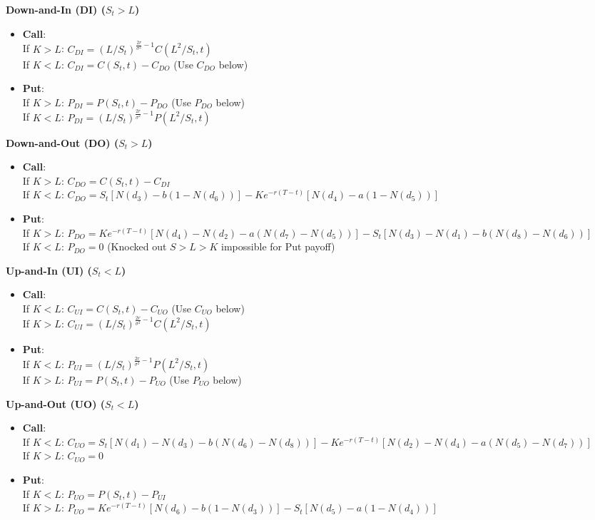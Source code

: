 \documentclass[8pt, a4paper, landscape]{extarticle}
\begin{document}
\begin{multicols*}{3}
\textbf{Down-and-In (DI) ($S_t > L$)}
\begin{itemize}
    \item \textbf{Call}: \\
    If $K > L$: $C_{DI} = (L/S_t)^{\frac{2r}{\sigma^2} - 1} C(L^2/S_t, t)$ \\
    If $K < L$: $C_{DI} = C(S_t, t) - C_{DO}$ (Use $C_{DO}$ below)
    \item \textbf{Put}: \\
    If $K > L$: $P_{DI} = P(S_t, t) - P_{DO}$ (Use $P_{DO}$ below) \\
    If $K < L$: $P_{DI} = (L/S_t)^{\frac{2r}{\sigma^2} - 1} P(L^2/S_t, t)$
\end{itemize}

\textbf{Down-and-Out (DO) ($S_t > L$)}
\begin{itemize}
    \item \textbf{Call}: \\
    If $K > L$: $C_{DO} = C(S_t, t) - C_{DI}$ \\
    If $K < L$: $C_{DO} = S_t [N(d_3) - b(1-N(d_6))] - K e^{-r(T-t)} [N(d_4) - a(1-N(d_5))]$
    \item \textbf{Put}: \\
    If $K > L$: $P_{DO} = K e^{-r(T-t)} [N(d_4) - N(d_2) - a(N(d_7) - N(d_5))] - S_t [N(d_3) - N(d_1) - b(N(d_8) - N(d_6))]$ \\
    If $K < L$: $P_{DO} = 0$ (Knocked out $S>L>K$ impossible for Put payoff)
\end{itemize}

\textbf{Up-and-In (UI) ($S_t < L$)}
\begin{itemize}
    \item \textbf{Call}: \\
    If $K < L$: $C_{UI} = C(S_t, t) - C_{UO}$ (Use $C_{UO}$ below) \\
    If $K > L$: $C_{UI} = (L/S_t)^{\frac{2r}{\sigma^2} - 1} C(L^2/S_t, t)$
    \item \textbf{Put}: \\
    If $K < L$: $P_{UI} = (L/S_t)^{\frac{2r}{\sigma^2} - 1} P(L^2/S_t, t)$ \\
    If $K > L$: $P_{UI} = P(S_t, t) - P_{UO}$ (Use $P_{UO}$ below)
\end{itemize}

\textbf{Up-and-Out (UO) ($S_t < L$)}
\begin{itemize}
    \item \textbf{Call}: \\
    If $K < L$: $C_{UO} = S_t [N(d_1) - N(d_3) - b(N(d_6) - N(d_8))] - K e^{-r(T-t)} [N(d_2) - N(d_4) - a(N(d_5) - N(d_7))]$ \\
    If $K > L$: $C_{UO} = 0$
    \item \textbf{Put}: \\
    If $K < L$: $P_{UO} = P(S_t, t) - P_{UI}$ \\
    If $K > L$: $P_{UO} = K e^{-r(T-t)} [N(d_6) - b(1-N(d_3))] - S_t [N(d_5) - a(1-N(d_4))]$
\end{itemize}


\end{multicols*}
\end{document}
